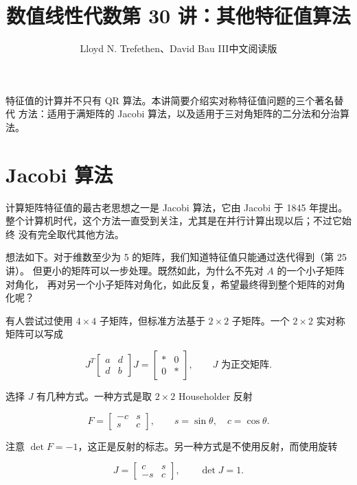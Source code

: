 \documentclass[UTF8,fontset=none,12pt]{ctexart}
\title{数值线性代数\quad 第 30 讲：其他特征值算法}
\author{Lloyd N. Trefethen、David Bau III\quad 中文阅读版}
\date{}
\begin{document}
\maketitle
\pagestyle{plain}

特征值的计算并不只有 QR 算法。本讲简要介绍实对称特征值问题的三个著名替代
方法：适用于满矩阵的 Jacobi 算法，以及适用于三对角矩阵的二分法和分治算法。

\section*{Jacobi 算法}

计算矩阵特征值的最古老思想之一是 Jacobi 算法，它由 Jacobi 于 1845 年提出。
整个计算机时代，这个方法一直受到关注，尤其是在并行计算出现以后；不过它始终
没有完全取代其他方法。

想法如下。对于维数至少为 5 的矩阵，我们知道特征值只能通过迭代得到（第 25 讲）。
但更小的矩阵可以一步处理。既然如此，为什么不先对 $A$ 的一个小子矩阵对角化，
再对另一个小子矩阵对角化，如此反复，希望最终得到整个矩阵的对角化呢？

有人尝试过使用 $4\times4$ 子矩阵，但标准方法基于 $2\times2$ 子矩阵。一个
$2\times2$ 实对称矩阵可以写成

\begin{equation}
J^T\begin{bmatrix}a&d\\d&b\end{bmatrix}J
 =\begin{bmatrix} *&0\\0&*\end{bmatrix},
\qquad J\text{ 为正交矩阵}.
\tag{30.1}
\end{equation}

选择 $J$ 有几种方式。一种方式是取 $2\times2$ Householder 反射

\begin{equation}
F=\begin{bmatrix}-c&s\\s&c\end{bmatrix},
\qquad s=\sin\theta,\quad c=\cos\theta.
\tag{30.2}
\end{equation}

注意 $\det F=-1$，这正是反射的标志。另一种方式是不使用反射，而使用旋转

\begin{equation}
J=\begin{bmatrix}c&s\\-s&c\end{bmatrix},
\qquad \det J=1.
\tag{30.3}
\end{equation}
\end{document}
